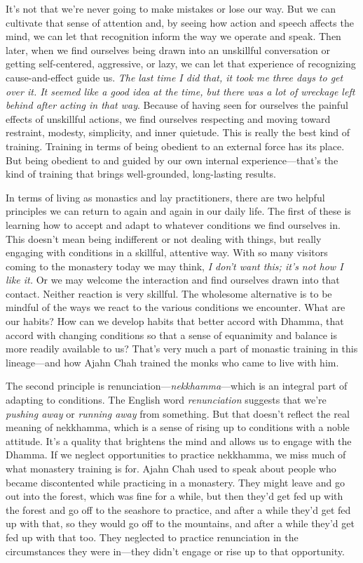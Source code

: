 It's not that we're never going to make mistakes or lose our way. But 
we can cultivate that sense of attention and, by seeing how action and 
speech affects the mind, we can let that recognition inform the way we 
operate and speak. Then later, when we find ourselves being drawn into 
an unskillful conversation or getting self-centered, aggressive, or 
lazy, we can let that experience of recognizing cause-and-effect guide 
us. \emph{The last time I did that, it took me three days to get over 
it. It seemed like a good idea at the time, but there was a lot of 
wreckage left behind after acting in that way}. Because of having seen 
for ourselves the painful effects of unskillful actions, we find 
ourselves respecting and moving toward restraint, modesty, simplicity, 
and inner quietude. This is really the best kind of training. Training 
in terms of being obedient to an external force has its place. But 
being obedient to and guided by our own internal experience---that's 
the kind of training that brings well-grounded, long-lasting results.


In terms of living as monastics and lay practitioners, there are two 
helpful principles we can return to again and again in our daily life. 
The first of these is learning how to accept and adapt to whatever 
conditions we find ourselves in. This doesn't mean being indifferent or 
not dealing with things, but really engaging with conditions in a 
skillful, attentive way. With so many visitors coming to the monastery 
today we may think, \emph{I don't want this; it's not how I like it.} 
Or we may welcome the interaction and find ourselves drawn into that 
contact. Neither reaction is very skillful. The wholesome alternative 
is to be mindful of the ways we react to the various conditions we 
encounter. What are our habits? How can we develop habits that better 
accord with Dhamma, that accord with changing conditions so that a 
sense of equanimity and balance is more readily available to us? That's 
very much a part of monastic training in this lineage---and how Ajahn 
Chah trained the monks who came to live with him.

The second principle is renunciation---\emph{nekkhamma}---which is an 
integral part of adapting to conditions. The English word 
\emph{renunciation} suggests that we're \emph{pushing away} or 
\emph{running away} from something. But that doesn't reflect the real 
meaning of nekkhamma, which is a sense of rising up to conditions with 
a noble attitude. It's a quality that brightens the mind and allows us 
to engage with the Dhamma. If we neglect opportunities to practice 
nekkhamma, we miss much of what monastery training is for. Ajahn Chah 
used to speak about people who became discontented while practicing in 
a monastery. They might leave and go out into the forest, which was 
fine for a while, but then they'd get fed up with the forest and go off 
to the seashore to practice, and after a while they'd get fed up with 
that, so they would go off to the mountains, and after a while they'd 
get fed up with that too. They neglected to practice renunciation in 
the circumstances they were in---they didn't engage or rise up to that 
opportunity.

